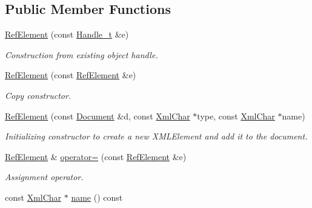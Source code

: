 \subsection*{Public Member Functions}
\begin{DoxyCompactItemize}
\item 
\hyperlink{class_d_d4hep_1_1_x_m_l_1_1_ref_element_a59a0e1ae7ebec907fd7df64528fcb654}{RefElement} (const \hyperlink{class_d_d4hep_1_1_x_m_l_1_1_handle__t}{Handle\_\-t} \&e)
\begin{DoxyCompactList}\small\item\em Construction from existing object handle. \item\end{DoxyCompactList}\item 
\hyperlink{class_d_d4hep_1_1_x_m_l_1_1_ref_element_ab35b2b5265479d3876429a6b8a825a99}{RefElement} (const \hyperlink{class_d_d4hep_1_1_x_m_l_1_1_ref_element}{RefElement} \&e)
\begin{DoxyCompactList}\small\item\em Copy constructor. \item\end{DoxyCompactList}\item 
\hyperlink{class_d_d4hep_1_1_x_m_l_1_1_ref_element_ad49f3b5422b4070c2fbb04622e94a208}{RefElement} (const \hyperlink{class_d_d4hep_1_1_x_m_l_1_1_document}{Document} \&d, const \hyperlink{namespace_d_d4hep_1_1_x_m_l_a09e5d9cc86ed782f6826dfe0778c1815}{XmlChar} $\ast$type, const \hyperlink{namespace_d_d4hep_1_1_x_m_l_a09e5d9cc86ed782f6826dfe0778c1815}{XmlChar} $\ast$name)
\begin{DoxyCompactList}\small\item\em Initializing constructor to create a new XMLElement and add it to the document. \item\end{DoxyCompactList}\item 
\hyperlink{class_d_d4hep_1_1_x_m_l_1_1_ref_element}{RefElement} \& \hyperlink{class_d_d4hep_1_1_x_m_l_1_1_ref_element_a5af29e6f73c8b0e1aa23dff6dbe8b39d}{operator=} (const \hyperlink{class_d_d4hep_1_1_x_m_l_1_1_ref_element}{RefElement} \&e)
\begin{DoxyCompactList}\small\item\em Assignment operator. \item\end{DoxyCompactList}\item 
const \hyperlink{namespace_d_d4hep_1_1_x_m_l_a09e5d9cc86ed782f6826dfe0778c1815}{XmlChar} $\ast$ \hyperlink{class_d_d4hep_1_1_x_m_l_1_1_ref_element_a3bdb94c1c90405444a2d3cb0fd6e3d8d}{name} () const 

\end{DoxyCompactItemize}
